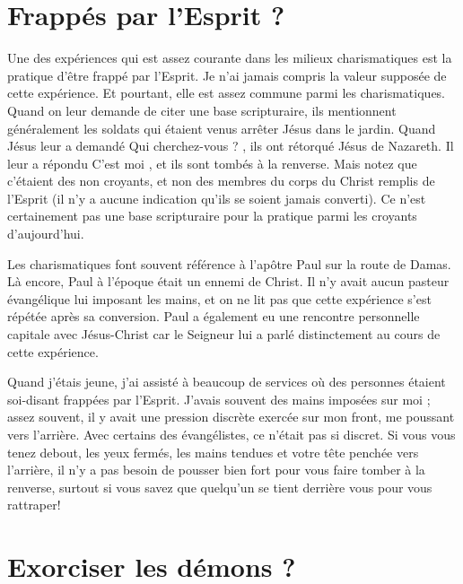 \section{Frapp\'es par l'Esprit ?}

Une des expériences qui est assez courante dans les milieux charismatiques
 est la pratique d'être \Og frappé par l'Esprit. \Fg{}
 Je n'ai jamais compris la valeur supposée de cette expérience.
 Et pourtant, elle est assez commune parmi les charismatiques.
 Quand on leur demande de citer une base scripturaire,
 ils mentionnent généralement les soldats qui étaient venus arrêter
 Jésus dans le jardin. Quand Jésus leur a demandé\frcolon{}
 \Og Qui cherchez-vous ? \Fg{}, ils ont rétorqué\frcolon{}
 \Og Jésus de Nazareth. \Fg{} Il leur a répondu\frcolon{}
 \Og C'est moi \Fg{}, et ils sont tombés à la renverse.
 Mais notez que c'étaient des non croyants, et non des membres
 du corps du Christ remplis de l'Esprit (il n'y a aucune indication
 qu'ils se soient jamais converti). Ce n'est certainement pas une base
 scripturaire pour la pratique parmi les croyants d'aujourd'hui.

Les charismatiques font souvent référence à l'apôtre Paul sur la route
 de Damas. Là encore, Paul à l'époque était un ennemi de Christ.
 Il n'y avait aucun pasteur évangélique lui imposant les mains,
 et on ne lit pas que cette expérience s'est répétée après sa conversion.
 Paul a également eu une rencontre personnelle capitale avec Jésus-Christ
 car le Seigneur lui a parlé distinctement au cours de cette expérience.

Quand j'étais jeune, j'ai assisté à beaucoup de services où des personnes
 étaient soi-disant frappées par l'Esprit.
 J'avais souvent des mains imposées sur moi ; assez souvent,
 il y avait une pression discrète exercée sur mon front,
 me poussant vers l'arrière. Avec certains des évangélistes,
 ce n'était pas si discret. Si vous vous tenez debout, les yeux fermés,
 les mains tendues et votre tête penchée vers l'arrière,
 il n'y a pas besoin de pousser bien fort pour vous faire tomber
 à la renverse, surtout si vous savez que quelqu'un se tient derrière
 vous pour vous rattraper!
 \nowidow[5]


\section{Exorciser les d\'emons ?}

